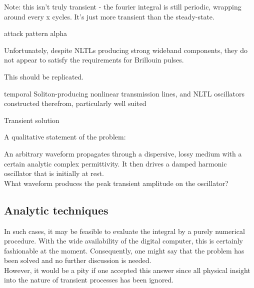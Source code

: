 \documentclass[paper.tex]{subfiles}
\begin{document}








Note: this isn't truly transient - the fourier integral is still periodic, wrapping around every x cycles. It's just more transient than the steady-state.




attack pattern alpha


 Unfortunately, despite NLTLs producing strong wideband components, they do not appear to satisfy the requirements for Brillouin pulses. 
\begin{autem}
	This should be replicated.
\end{autem}

temporal Soliton-producing nonlinear transmission lines, and NLTL oscillators constructed therefrom, particularly well suited 


Transient solution

\pagebreak
A qualitative statement of the problem:

\begin{toolchain}
An arbitrary waveform propagates through a dispersive, lossy medium with a certain analytic complex permittivity. It then drives a
damped harmonic oscillator that is initially at rest.\\

What waveform produces the peak transient amplitude on the oscillator?
\end{toolchain}

\subsection{Analytic techniques}



\begin{fquote}
	In such cases, it may be feasible to evaluate the integral by a purely numerical procedure. With the wide availability of the digital computer, this is certainly fashionable at the moment. Consequently, one might say that the problem has been solved and no further discussion is needed. \\
	
	However, it would be a pity if one accepted this answer since all physical insight into the nature of transient processes has been ignored. 
\end{fquote}
\end{document}
